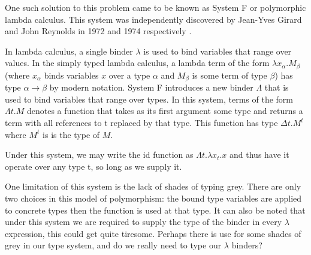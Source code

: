     One such solution to this problem came to be known as System F
    or polymorphic lambda calculus. This system was independently
    discovered by Jean-Yves Girard and John Reynolds in 1972 and 1974
    respectively \cite{Girard1972,reynolds1974}.

    In lambda calculus, a single binder $\lambda$ is used to bind variables
    that range over values. In the simply typed lambda calculus, a
    lambda term of the form $\lambda x_{\alpha}.M_{\beta}$ (where
    $x_{\alpha}$ binds variables $x$ over a type $\alpha$ and
    $M_{\beta}$ is some term of type $\beta $) has type
    $\alpha\to\beta$ by modern notation. System F introduces a new
    binder $\Lambda$ that is used to bind variables that range over
    types. In this system, terms of the form $\Lambda t.M$ denotes a
    function that takes as its first argument some type and returns a
    term with all references to t replaced by that type. This function
    has type $\Delta t.M^{t}$ where $M^t$ is is the type of $M$.

    Under this system, we may write the id function as $\Lambda t
    . \lambda x_t . x$ and thus have it operate over any type t,
    so long as we supply it.

    One limitation of this system is the lack of shades of typing
    grey. There are only two choices in this model of polymorphism:
    the bound type variables are applied to concrete types then the
    function is used at that type. It can also be noted that under
    this system we are required to supply the type of the binder in
    every $\lambda$ expression, this could get quite tiresome. Perhaps
    there is use for some shades of grey in our type system, and do we
    really need to type our $\lambda$ binders?

